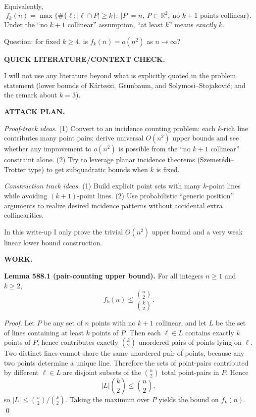 Equivalently,
\[
 f_k(n)=\max\{\#\{\ell: |\ell\cap P|\ge k\}:\ |P|=n,\ P\subset\mathbb{R}^2,\ \text{no }k+1\text{ points collinear}\}.
\]
Under the ``no $k+1$ collinear'' assumption, ``at least $k$'' means \emph{exactly $k$}.

Question: for fixed $k\ge 4$, is $f_k(n)=o(n^2)$ as $n\to\infty$?

\bigskip
\noindent\textbf{QUICK LITERATURE/CONTEXT CHECK.}

I will not use any literature beyond what is explicitly quoted in the problem statement (lower bounds of K\'arteszi, Gr\"unbaum, and Solymosi--Stojakovi\'c; and the remark about $k=3$).

\bigskip
\noindent\textbf{ATTACK PLAN.}

\emph{Proof-track ideas.}
(1) Convert to an incidence counting problem: each $k$-rich line contributes many point pairs; derive universal $O(n^2)$ upper bounds and see whether any improvement to $o(n^2)$ is possible from the ``no $k+1$ collinear'' constraint alone.
(2) Try to leverage planar incidence theorems (Szemer\'edi--Trotter type) to get subquadratic bounds when $k$ is fixed.

\emph{Construction track ideas.}
(1) Build explicit point sets with many $k$-point lines while avoiding $(k+1)$-point lines.
(2) Use probabilistic ``generic position'' arguments to realize desired incidence patterns without accidental extra collinearities.

In this write-up I only prove the trivial $O(n^2)$ upper bound and a very weak linear lower bound construction.

\bigskip
\noindent\textbf{WORK.}

\noindent\textbf{Lemma 588.1 (pair-counting upper bound).}
For all integers $n\ge 1$ and $k\ge 2$,
\[
 f_k(n)\le \frac{\binom{n}{2}}{\binom{k}{2}}.
\]

\noindent\emph{Proof.}
Let $P$ be any set of $n$ points with no $k+1$ collinear, and let $L$ be the set of lines containing at least $k$ points of $P$.
Then each $\ell\in L$ contains exactly $k$ points of $P$, hence contributes exactly $\binom{k}{2}$ unordered pairs of points lying on $\ell$.
Two distinct lines cannot share the same unordered pair of points, because any two points determine a unique line.
Therefore the sets of point-pairs contributed by different $\ell\in L$ are disjoint subsets of the $\binom{n}{2}$ total point-pairs in $P$.
Hence
\[
 |L|\binom{k}{2}\le \binom{n}{2},
\]
so $|L|\le \binom{n}{2}/\binom{k}{2}$.
Taking the maximum over $P$ yields the bound on $f_k(n)$.
\qed

